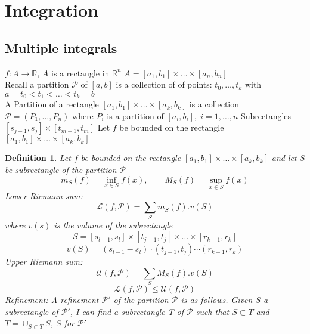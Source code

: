 \documentclass[12pt]{article}
\def\RR{\mathbb{R}}
\newtheorem{definition}{Definition}[section]
\begin{document}
\section{Integration}
\subsection{Multiple integrals}

$f:A \rightarrow \RR$, $A$ is a rectangle in $\RR^n$ $A= [a_1,b_1]\times \dots \times[a_n , b_n]$\\
Recall a partition $\mathcal{P}$ of $[a,b]$ is a collection of of points: $t_{0}, \dots , t_k$ with $a=t_0 < t_1 < \dots <t_k = b$\\
A Partition of a rectangle $ [a_1 , b_1]\times\dots \times [a_k , b_k]$ is a collection $\mathcal{P} = (P_1 , \dots , P_n)$ where $P_i$ is a partition of $[a_i, b_i], \; i=1,\dots ,n$ Subrectangles $[s_{j-1},s_j]\times[t_{m-1},t_m]$ Let $f$ be bounded on the rectangle  $ [a_1 , b_1]\times\dots \times [a_k , b_k]$

\begin{definition}
 Let $f$ be bounded on the rectangle  $ [a_1 , b_1]\times\dots \times [a_k , b_k]$ and let $S$ be subrectangle of the partition $\mathcal{P}$  
\[m_S(f) = \inf_{x \in S}f(x), \qquad M_S (f) = \sup_{x \in S}f(x) \]
Lower Riemann sum:
\[\mathcal{L}(f,\mathcal{P}) = \sum_{S}m_S(f).v(S)\]
where $v(s)$ is the volume of the subrectangle
\[S=[s_{l-1}, s_l] \times [t_{j-1},t_j] \times \dots \times[r_{k-1},r_k]\]
\[v(S)= (s_{l-1}- s_l)\cdot(t_{j-1},t_j)\cdots (r_{k-1},r_k)\]
Upper Riemann sum:
\[\mathcal{U}(f,\mathcal{P})= \sum_{S}M_S(f).v(S)\]
\[ \mathcal{L}(f,\mathcal{P}) \leq \mathcal{U}(f,\mathcal{P})\]
Refinement: A refinement $\mathcal{P}'$ of the partition $\mathcal{P}$ is as follows. Given $S$ a subrectangle of $\mathcal{P}'$, I can find a subrectangle T of $\mathcal{P}$ such that $S \subset T$ and $T= \cup_{S \subset T} S$, $S$ for $\mathcal{P}'$
\end{definition}

\setcounter{equation}{0}
\end{document}
